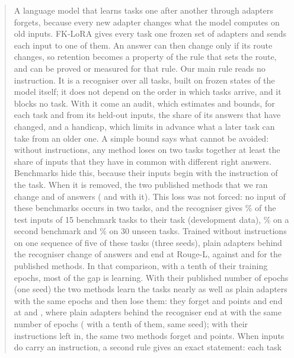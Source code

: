 \begin{abstract}
A language model that learns tasks one after another through adapters forgets, because every new
adapter changes what the model computes on old inputs. FK-LoRA gives every task one frozen set of
adapters and sends each input to one of them. An answer can then change only if its route changes,
so retention becomes a property of the rule that sets the route, and can be proved or measured for
that rule. Our main rule reads no instruction. It is a recogniser over all tasks, built on frozen
states of the model itself; it does not depend on the order in which tasks arrive, and it blocks no
task. With it come an audit, which estimates and bounds, for each task and from its held-out
inputs, the share of its answers that have changed, and a handicap, which limits in advance what a
later task can take from an older one. A simple bound says what cannot be avoided: without
instructions, any method loses on two tasks together at least the share
of inputs that they have in common with different right answers. Benchmarks hide this, because
their inputs begin with the instruction of the task. When it is removed, the two published methods
that we ran change \AudSeedsGainloraChanged{} and \AudSeedsInfloraChanged{} of \AudSeedsCompared{}
answers (\FiveGainChanged{} and \FiveInfChanged{} with it). This loss was not forced: no input of
these benchmarks occurs in two tasks, and the recogniser gives \AudDevLLamOneEnd{}\% of the test
inputs of 15 benchmark tasks to their task (development data), \AudScaleLongThreeEnd{}\% on a second
benchmark and \AudFreshFourthLEnd{}\% on 30 unseen tasks. Trained without instructions on one
sequence of five of these tasks (three seeds), plain adapters behind the recogniser change
\AudSeedsRidgeChanged{} of \AudSeedsCompared{} answers and end at \AudSeedsRidgeAPOne{} Rouge-L,
against \AudSeedsGainloraAPOne{} and \AudSeedsInfloraAPOne{} for the published methods. In that
comparison, with a tenth of their training epochs, most of the gap is learning. With their
published number of epochs (one seed) the two methods learn the tasks nearly as well as plain adapters
with the same epochs and then lose them: they forget \AudFullGainloraFTInt{} and \AudFullInfloraFTInt{} points and end
at \AudFullGainloraAPOne{} and \AudFullInfloraAPOne{}, where plain adapters behind the recogniser
end at \AudFullOursRidgeAPOne{} with the same number of epochs (\AudOursRidgeAPOne{} with a tenth of them, same seed); with their instructions left in, the same two methods forget \AudFullDefOriginalGainloraFTOne{} and \AudFullDefOriginalInfloraFTOne{} points. When inputs do carry an instruction, a second rule gives an exact statement: each task

\end{abstract}
